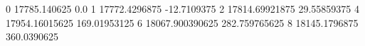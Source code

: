 0 17785.140625 0.0
1 17772.4296875 -12.7109375
2 17814.69921875 29.55859375
4 17954.16015625 169.01953125
6 18067.900390625 282.759765625
8 18145.1796875 360.0390625
